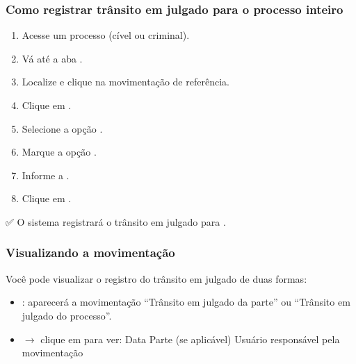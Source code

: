 \documentclass[letterpaper,10pt,brazil]{sphinxmanual}
\begin{document}
\subsubsection{Como registrar trânsito em julgado para o processo inteiro}
\label{\detokenize{projud_40_transitaremjulgado:como-registrar-transito-em-julgado-para-o-processo-inteiro}}\begin{enumerate}
%
\item {} 
\sphinxAtStartPar
Acesse um processo (cível ou criminal).

\item {} 
\sphinxAtStartPar
Vá até a aba .

\item {} 
\sphinxAtStartPar
Localize e clique na movimentação de referência.

\item {} 
\sphinxAtStartPar
Clique em .

\item {} 
\sphinxAtStartPar
Selecione a opção .

\item {} 
\sphinxAtStartPar
Marque a opção .

\item {} 
\sphinxAtStartPar
Informe a .

\item {} 
\sphinxAtStartPar
Clique em .

\end{enumerate}

\sphinxAtStartPar
✅ O sistema registrará o trânsito em julgado para .


\subsubsection{Visualizando a movimentação}
\label{\detokenize{projud_40_transitaremjulgado:visualizando-a-movimentacao}}
\sphinxAtStartPar
Você pode visualizar o registro do trânsito em julgado de duas formas:
\begin{itemize}
\item {} 
\sphinxAtStartPar
{}: aparecerá a movimentação “Trânsito em julgado da parte” ou “Trânsito em julgado do processo”.

\item {} 
\sphinxAtStartPar
{} \(\rightarrow\) clique em  para ver:
\sphinxhyphen{} Data
\sphinxhyphen{} Parte (se aplicável)
\sphinxhyphen{} Usuário responsável pela movimentação

\end{itemize}
\end{document}
